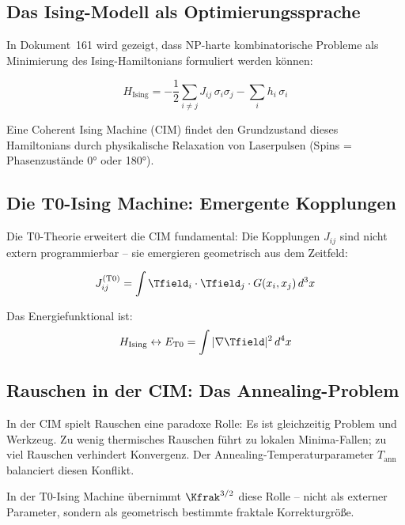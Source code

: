 \subsection{Das Ising-Modell als Optimierungssprache}

In Dokument~161 \cite{pascher:ising} wird gezeigt, dass NP-harte kombinatorische
Probleme als Minimierung des Ising-Hamiltonians formuliert werden können:

\begin{equation}
    H_{\text{Ising}} = -\frac{1}{2} \sum_{i \neq j} J_{ij} \, \sigma_i \sigma_j
    - \sum_i h_i \, \sigma_i
    \label{eq:ising}
\end{equation}

Eine Coherent Ising Machine (CIM) findet den Grundzustand dieses Hamiltonians durch
physikalische Relaxation von Laserpulsen (Spins = Phasenzustände 0° oder 180°).

\subsection{Die T0-Ising Machine: Emergente Kopplungen}

Die T0-Theorie erweitert die CIM fundamental: Die Kopplungen $J_{ij}$ sind nicht
extern programmierbar -- sie emergieren geometrisch aus dem Zeitfeld:

\begin{equation}
    J_{ij}^{(\text{T0})} = \int \Tfield_i \cdot \Tfield_j \cdot G(x_i, x_j) \, d^3x
    \label{eq:t0_coupling}
\end{equation}

Das Energiefunktional ist:
\begin{equation}
    H_{\text{Ising}} \leftrightarrow E_{\text{T0}} = \int |\nabla \Tfield|^2 \, d^4x
    \label{eq:energy_equiv}
\end{equation}

\subsection{Rauschen in der CIM: Das Annealing-Problem}

In der CIM spielt Rauschen eine paradoxe Rolle: Es ist gleichzeitig Problem und
Werkzeug. Zu wenig thermisches Rauschen führt zu lokalen Minima-Fallen;
zu viel Rauschen verhindert Konvergenz. Der Annealing-Temperaturparameter
$T_{\text{ann}}$ balanciert diesen Konflikt.

In der T0-Ising Machine übernimmt $\Kfrak^{3/2}$ diese Rolle -- nicht als
externer Parameter, sondern als geometrisch bestimmte fraktale Korrekturgröße.

